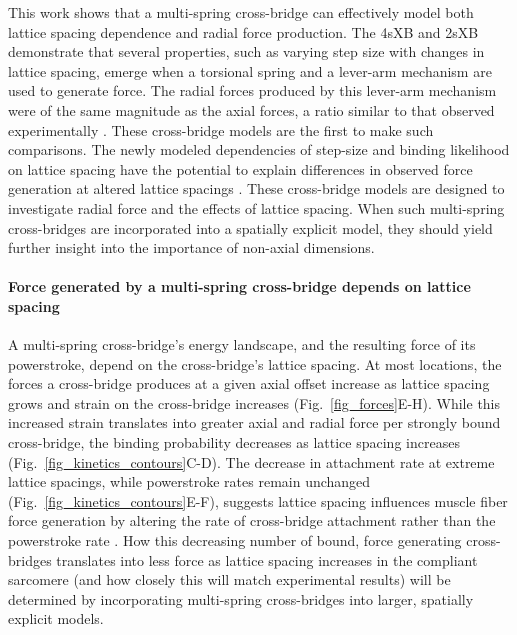 \documentclass[]{article}
\begin{document}
This work shows that a multi-spring cross-bridge can effectively model both lattice spacing dependence and radial force production. 
The 4sXB and 2sXB demonstrate that several properties, such as varying step size with changes in lattice spacing, emerge when a torsional spring and a lever-arm mechanism are used to generate force. 
The radial forces produced by this lever-arm mechanism were of the same magnitude as the axial forces, a ratio similar to that observed experimentally \citep{Cecchi1990,Brenner1991}. 
These cross-bridge models are the first to make such comparisons.
The newly modeled dependencies of step-size and binding likelihood on lattice spacing have the potential to explain differences in observed force generation at altered lattice spacings  \citep{Millman1998}. 
These cross-bridge models are designed to investigate radial force and the effects of lattice spacing. 
When such multi-spring cross-bridges are incorporated into a spatially explicit model, they should yield further insight into the importance of non-axial dimensions. 

\paragraph{Force generated by a multi-spring cross-bridge depends on lattice spacing} %
A multi-spring cross-bridge's energy landscape, and the resulting force of its powerstroke, depend on the cross-bridge's lattice spacing.
At most locations, the forces a cross-bridge produces at a given axial offset increase as lattice spacing grows and strain on the cross-bridge increases (Fig.~\ref{fig_forces}E-H). 
While this increased strain translates into greater axial and radial force per strongly bound cross-bridge, the binding probability decreases as lattice spacing increases (Fig.~\ref{fig_kinetics_contours}C-D).
The decrease in attachment rate at extreme lattice spacings, while powerstroke rates remain unchanged (Fig.~\ref{fig_kinetics_contours}E-F), suggests lattice spacing influences muscle fiber force generation by altering the rate of cross-bridge attachment rather than the powerstroke rate \citep{Martyn2004}. 
How this decreasing number of bound, force generating cross-bridges translates into less force as lattice spacing increases in the compliant sarcomere (and how closely this will match experimental results) will be determined by incorporating multi-spring cross-bridges into larger, spatially explicit models. %
\end{document}
